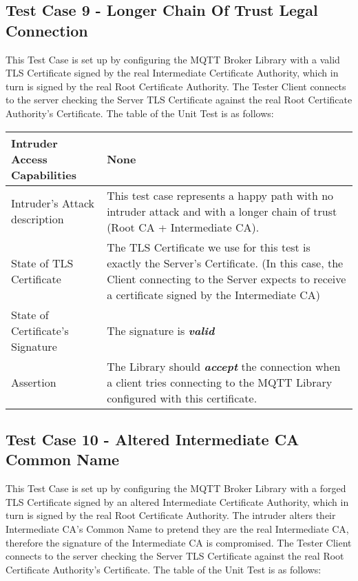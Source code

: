 \documentclass[binding=0.6cm,noexaminfo]{sapthesis}
\begin{document}
\subsection{Test Case 9 - Longer Chain Of Trust Legal Connection}
This Test Case is set up by configuring the MQTT Broker Library with a valid TLS Certificate signed by the real Intermediate Certificate Authority, which in turn is signed by the real Root Certificate Authority. The Tester Client connects to the server checking the Server TLS Certificate against the real Root Certificate Authority’s Certificate. The table of the Unit Test is as follows:

\begin{center}
\begin{tabular}{| p{6cm} | p{6cm} |}
\hline
Intruder Access Capabilities & None \\
\hline
Intruder’s Attack description & This test case represents a happy path with no intruder attack and with a longer chain of trust (Root CA + Intermediate CA). \\
\hline
State of TLS Certificate & The TLS Certificate we use for this test is exactly the Server’s Certificate. (In this case, the Client connecting to the Server expects to receive a certificate signed by the Intermediate CA) \\
\hline
State of Certificate’s Signature & The signature is \textbf{\textit{valid}} \\
\hline
Assertion & The Library should \textbf{\textit{accept}} the connection when a client tries connecting to the MQTT Library configured with this certificate. \\
\hline
\end{tabular}
\end{center}

\subsection{Test Case 10 - Altered Intermediate CA Common Name}
This Test Case is set up by configuring the MQTT Broker Library with a forged TLS Certificate signed by an altered Intermediate Certificate Authority, which in turn is signed by the real Root Certificate Authority. The intruder alters their Intermediate CA’s Common Name to pretend they are the real Intermediate CA, therefore the signature of the Intermediate CA is compromised. The Tester Client connects to the server checking the Server TLS Certificate against the real Root Certificate Authority’s Certificate. The table of the Unit Test is as follows:
\end{document}
